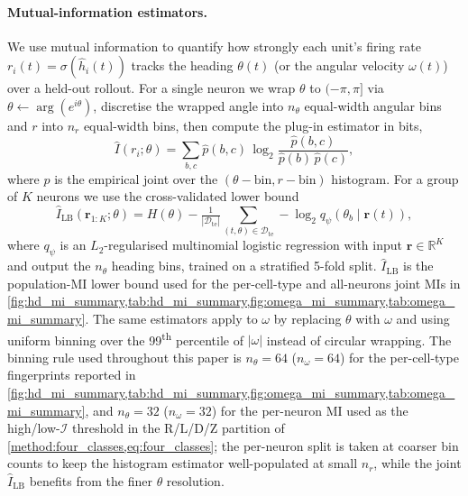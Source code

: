 \documentclass[11pt]{article}
\newcommand{\mi}{\mathcal{I}}
\begin{document}
\paragraph{Mutual-information estimators.}\label{method:MI}
We use mutual information to quantify how strongly each unit's
firing rate $r_i(t) = \sigma(\hat h_i(t))$ tracks the heading
$\theta(t)$ (or the angular velocity $\omega(t)$) over a held-out
rollout. For a single neuron we wrap $\theta$ to $(-\pi, \pi]$ via
$\theta \leftarrow \arg(e^{i\theta})$, discretise the wrapped angle
into $n_\theta$ equal-width angular bins and $r$ into $n_r$
equal-width bins, then compute the plug-in estimator in bits,
\begin{equation}
\hat I(r_i;\theta) = \sum_{b,c} \hat p(b,c)\,\log_2
\frac{\hat p(b,c)}{\hat p(b)\,\hat p(c)},
\label{eq:mi_plugin}
\end{equation}
where $\hat p$ is the empirical joint over the $(\theta\!\!-\!\!\mathrm{bin}, r\!\!-\!\!\mathrm{bin})$
histogram. For a group of $K$ neurons we use the cross-validated
lower bound
\begin{equation}
\hat I_{\mathrm{LB}}(\mathbf r_{1:K};\theta) =
H(\theta) - \tfrac{1}{|\mathcal D_{\mathrm{te}}|}
\sum_{(t,\theta)\in\mathcal D_{\mathrm{te}}}
-\log_2 q_\psi(\theta_b\mid \mathbf r(t)),
\label{eq:mi_joint_lb}
\end{equation}
where $q_\psi$ is an $L_2$-regularised multinomial logistic
regression with input $\mathbf r \in \mathbb R^K$ and output the
$n_\theta$ heading bins, trained on a stratified 5-fold split.
$\hat I_{\mathrm{LB}}$ is the population-MI lower bound used for
the per-cell-type and all-neurons joint MIs in
\cref{fig:hd_mi_summary,tab:hd_mi_summary,fig:omega_mi_summary,tab:omega_mi_summary}.
The same estimators apply to $\omega$ by replacing $\theta$ with
$\omega$ and using uniform binning over the 99\textsuperscript{th}
percentile of $|\omega|$ instead of circular wrapping.
The binning rule used throughout this paper is
$n_\theta = 64$ ($n_\omega = 64$) for the per-cell-type
fingerprints reported in
\cref{fig:hd_mi_summary,tab:hd_mi_summary,fig:omega_mi_summary,tab:omega_mi_summary},
and $n_\theta = 32$ ($n_\omega = 32$) for the per-neuron MI used
as the high/low-$\mi$ threshold in the R/L/D/Z partition of
\cref{method:four_classes,eq:four_classes}; the per-neuron split
is taken at coarser bin counts to keep the histogram estimator
well-populated at small $n_r$, while the joint $\hat I_{\mathrm{LB}}$
benefits from the finer $\theta$ resolution.
\end{document}
